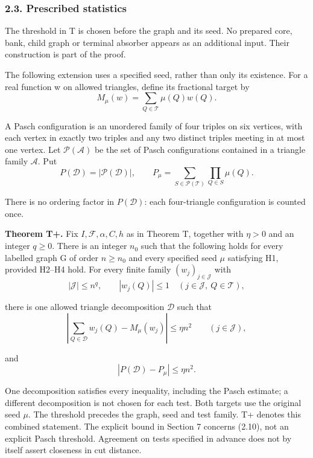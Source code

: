 \documentclass[english,11pt,a4paper]{article}
\begin{document}
\subsubsection{2.3. Prescribed statistics}\label{prescribed-statistics}

The threshold in T is chosen before the graph and its seed. No prepared core, bank, child graph or terminal absorber appears as an additional input. Their construction is part of the proof.

The following extension uses a specified seed, rather than only its existence. For a real function w on allowed triangles, define its fractional target by
\[M_\mu(w)=\sum_{Q\in\mathcal T}\mu(Q)w(Q).                   \tag{2.7}\]

A Pasch configuration is an unordered family of four triples on six vertices, with each vertex in exactly two triples and any two distinct triples meeting in at most one vertex. Let \(\mathcal P(\mathcal A)\) be the set of Pasch configurations contained in a triangle family \(\mathcal A\). Put
\[P(\mathcal D)=|\mathcal P(\mathcal D)|,
\qquad
P_\mu=\sum_{S\in\mathcal P(\mathcal T)}\prod_{Q\in S}\mu(Q).
                                                                    \tag{2.8}\]

There is no ordering factor in \(P(\mathcal D)\): each four-triangle configuration is counted once.

\textbf{Theorem T+.} Fix \(I,\mathcal F,\alpha,C,h\) as in Theorem T, together with \(\eta>0\) and an integer \(q\geq0\). There is an integer \(n_0\) such that the following holds for every labelled graph G of order \(n\geq n_0\) and every specified seed \(\mu\) satisfying H1, provided H2--H4 hold. For every finite family \((w_j)_{j\in\mathcal J}\) with
\[|\mathcal J|\leq n^q,
\qquad |w_j(Q)|\leq1\quad(j\in\mathcal J,\ Q\in\mathcal T),          \tag{2.9}\]

there is one allowed triangle decomposition \(\mathcal D\) such that
\[\left|\sum_{Q\in\mathcal D}w_j(Q)-M_\mu(w_j)\right|
\leq\eta n^2\qquad(j\in\mathcal J),                                \tag{2.10}\]

and
\[|P(\mathcal D)-P_\mu|\leq\eta n^2.                                \tag{2.11}\]

One decomposition satisfies every inequality, including the Pasch estimate; a different decomposition is not chosen for each test. Both targets use the original seed \(\mu\). The threshold precedes the graph, seed and test family. T+ denotes this combined statement. The explicit bound in Section 7 concerns (2.10), not an explicit Pasch threshold. Agreement on tests specified in advance does not by itself assert closeness in cut distance.
\end{document}

